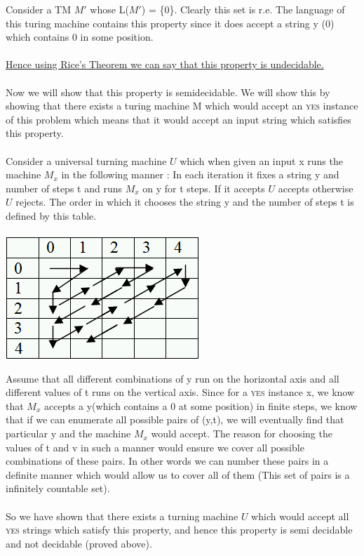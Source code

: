 \documentclass[11pt]{article}
\begin{document}
Consider a TM $M'$ whose L($M'$) = \{0\}. Clearly this set is r.e. The language of this turing machine contains this property since it does accept a string y (0) which contains 0 in some position.\\\\
\underline{Hence using Rice's Theorem we can say that this property is undecidable.}\\\\
Now we will show that this property is semidecidable. We will show this by showing that there exists a turing machine M which would accept an \textsc{yes} instance of this problem which means that it would accept an input string which satisfies this property.\\\\
Consider a universal turning machine $U$ which when given an input x runs the machine $M_x$ in the following manner : In each iteration it fixes a string y and number of steps t and runs $M_x$ on y for t steps. If it accepts $U$ accepts otherwise $U$ rejects. The order in which it chooses the string y and the number of steps t is defined by this table. 
\\\\
\includegraphics{countablyinfinitepairs.png}


Assume that all different combinations of y run on the horizontal axis and all different values of t runs on the vertical axis. Since for a \textsc{yes} instance x, we know that $M_x$ accepts a y(which contains a 0 at some position) in finite steps, we know that if we can enumerate all possible pairs of (y,t), we will eventually find that particular y and the machine $M_x$ would accept. The reason for choosing the values of t and v in such a manner would ensure we cover all possible combinations of these pairs. In other words we can number these pairs in a definite manner which would allow us to cover all of them (This set of pairs is a infinitely countable set).\\\\
So we have shown that there exists a turning machine $U$ which would accept all \textsc{yes} strings which satisfy this property, and hence this property is semi decidable and not decidable (proved above).
\end{document}
